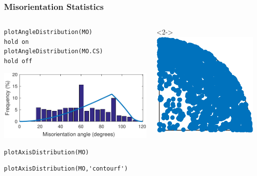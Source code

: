\documentclass[compress]{beamer}
\begin{document}
\begin{frame}[fragile]
  \frametitle{Misorientation Statistics}

  \begin{columns}
    \begin{column}{8cm}
      \begin{lstlisting}[style=input]
plotAngleDistribution(MO)
hold on
plotAngleDistribution(MO.CS)
hold off
      \end{lstlisting}

      \includegraphics[width=\textwidth]{pic/angleDistri}

      \pause

  \begin{lstlisting}[style=input]
plotAxisDistribution(MO)
  \end{lstlisting}

  \pause
\vspace{-0.3cm}
  \begin{lstlisting}[style=input]
plotAxisDistribution(MO,'contourf')
  \end{lstlisting}
\end{column}
\begin{column}{4cm}
  \begin{overlayarea}{\textwidth}{8cm}
    \begin{onlyenv}<2->
      \includegraphics[width = \textwidth]{pic/axisDistri}
    \end{onlyenv}


\end{overlayarea}
\end{column}
\end{columns}
\end{frame}
\end{document}
